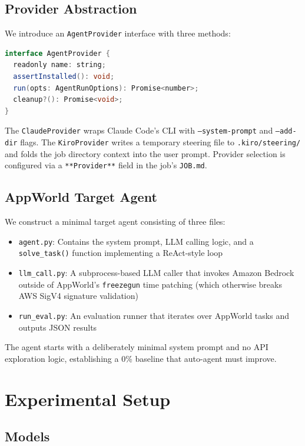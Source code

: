 \documentclass[11pt,a4paper]{article}
\begin{document}
\subsection{Provider Abstraction}

We introduce an \texttt{AgentProvider} interface with three methods:

\begin{lstlisting}[language=Java]
interface AgentProvider {
  readonly name: string;
  assertInstalled(): void;
  run(opts: AgentRunOptions): Promise<number>;
  cleanup?(): Promise<void>;
}
\end{lstlisting}

The \texttt{ClaudeProvider} wraps Claude Code's CLI with \texttt{--system-prompt} and \texttt{--add-dir} flags. The \texttt{KiroProvider} writes a temporary steering file to \texttt{.kiro/steering/} and folds the job directory context into the user prompt. Provider selection is configured via a \texttt{**Provider**} field in the job's \texttt{JOB.md}.

\subsection{AppWorld Target Agent}

We construct a minimal target agent consisting of three files:

\begin{itemize}
    \item \texttt{agent.py}: Contains the system prompt, LLM calling logic, and a \texttt{solve\_task()} function implementing a ReAct-style loop
    \item \texttt{llm\_call.py}: A subprocess-based LLM caller that invokes Amazon Bedrock outside of AppWorld's \texttt{freezegun} time patching (which otherwise breaks AWS SigV4 signature validation)
    \item \texttt{run\_eval.py}: An evaluation runner that iterates over AppWorld tasks and outputs JSON results
\end{itemize}

The agent starts with a deliberately minimal system prompt and no API exploration logic, establishing a 0\% baseline that auto-agent must improve.

\section{Experimental Setup}

\subsection{Models}
\end{document}
